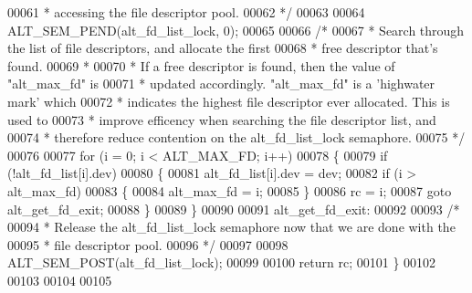 \begin{DoxyCode}
00061 \textcolor{comment}{   * accessing the file descriptor pool.}
00062 \textcolor{comment}{   */}
00063   
00064   ALT_SEM_PEND(alt\_fd\_list\_lock, 0);
00065   
00066   \textcolor{comment}{/* }
00067 \textcolor{comment}{   * Search through the list of file descriptors, and allocate the first}
00068 \textcolor{comment}{   * free descriptor that's found. }
00069 \textcolor{comment}{   *}
00070 \textcolor{comment}{   * If a free descriptor is found, then the value of "alt\_max\_fd" is }
00071 \textcolor{comment}{   * updated accordingly. "alt\_max\_fd" is a 'highwater mark' which }
00072 \textcolor{comment}{   * indicates the highest file descriptor ever allocated. This is used to}
00073 \textcolor{comment}{   * improve efficency when searching the file descriptor list, and }
00074 \textcolor{comment}{   * therefore reduce contention on the alt\_fd\_list\_lock semaphore. }
00075 \textcolor{comment}{   */}
00076 
00077   \textcolor{keywordflow}{for} (i = 0; i < ALT_MAX_FD; i++)
00078   \{
00079     \textcolor{keywordflow}{if} (!alt_fd_list[i].dev)
00080     \{
00081       alt_fd_list[i].dev = dev;
00082       \textcolor{keywordflow}{if} (i > alt_max_fd)
00083       \{
00084         alt_max_fd = i;
00085       \}
00086       rc = i;
00087       \textcolor{keywordflow}{goto} alt\_get\_fd\_exit;
00088     \}
00089   \}
00090 
00091  alt\_get\_fd\_exit:
00092 
00093   \textcolor{comment}{/*}
00094 \textcolor{comment}{   * Release the alt\_fd\_list\_lock semaphore now that we are done with the}
00095 \textcolor{comment}{   * file descriptor pool.}
00096 \textcolor{comment}{   */}
00097 
00098   ALT_SEM_POST(alt\_fd\_list\_lock);
00099 
00100   \textcolor{keywordflow}{return} rc;
00101 \}
00102 
00103 
00104 
00105 
\end{DoxyCode}
